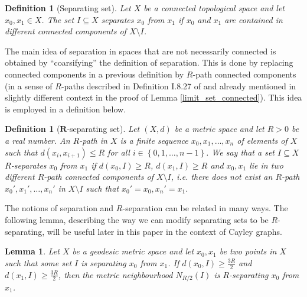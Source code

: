 \documentclass[12pt, a4paper]{article}
\newcommand{\8}{\infty}
\newcommand{\set}[1]{\left\{ #1 \right\}}
\theoremstyle{break}
\newtheorem{lm}[thm]{Lemma}
\theoremstyle{defbreak}
\newtheorem{df}[thm]{Definition}
\begin{document}
\begin{df}[Separating set]
    Let $X$ be a connected topological space and let $x_0, x_1\in X$. The set $I\subseteq X$ \textit{separates} $x_0$ from $x_1$ if $x_0$ and $x_1$ are contained in different connected components of $X\setminus I$.
\end{df}

The main idea of separation in spaces that are not necessarily connected is obtained by ``coarsifying'' the definition of separation. This is done by replacing connected components in a previous definition by $R$-path connected components (in a sense of $R$-paths described in Definition I.8.27 of \cite{bh} and already mentioned in slightly different context in the proof of Lemma \ref{limit_set_connected}). This idea is employed in a definition below.\medskip

\begin{df}[$\mathbf{R}$-separating set]\label{def:R-separating_set}
    Let $(X,d)$ be a metric space and let $R>0$ be a real number. An \textit{$R$-path} in $X$ is a finite sequence $x_0, x_1, \ldots, x_n$ of elements of $X$ such that $d(x_i,x_{i+1}) \leqslant R$ for all $i\in \set{0,1,\ldots, n-1}$. We say that a set $I \subseteq X$ \textit{$R$\nobreakdash-separates} $x_0$ from $x_1$ if $d(x_0, I) \geqslant R$, $d(x_1, I) \geqslant R$ and $x_0,x_1$ lie in two different $R$-path connected components of $X\setminus I$, i.e. there does not exist an $R$-path $x_0', x_1', \ldots, x_n'$ in $X\setminus I$ such that $x_0' = x_0, x_n' = x_1$.
\end{df}

The notions of separation and $R$-separation can be related in many ways. The following lemma, describing the way we can modify separating sets to be $R$-separating, will be useful later in this paper in the context of Cayley graphs.\medskip

\begin{lm}\label{separation-to-Rseparation}
    Let $X$ be a geodesic metric space and let $x_0,x_1$ be two points in $X$ such that some set $I$ is separating $x_0$ from $x_1$. If $d(x_0,I)\geqslant \frac{3R}{2}$ and $d(x_1,I) \geqslant \frac{3R}{2}$, then the metric neighbourhood $N_{R/2}(I)$ is $R$-separating $x_0$ from $x_1$.
\end{lm}
\end{document}
